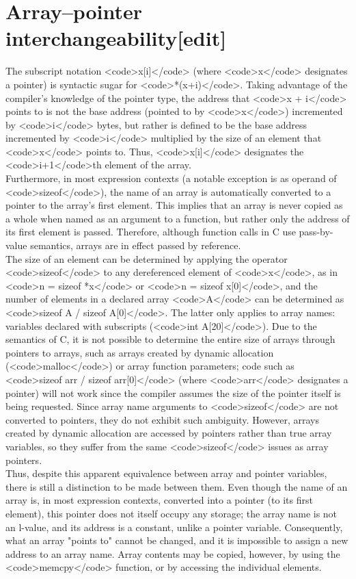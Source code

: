 \documentclass{article}\usepackage{titlesec}
\begin{document}
\section{Array–pointer interchangeability[edit]}
The subscript notation <code>x[i]</code> (where <code>x</code> designates a pointer) is syntactic sugar for <code>*(x+i)</code>. Taking advantage of the compiler's knowledge of the pointer type, the address that <code>x + i</code> points to is not the base address (pointed to by <code>x</code>) incremented by <code>i</code> bytes, but rather is defined to be the base address incremented by <code>i</code> multiplied by the size of an element that <code>x</code> points to.  Thus, <code>x[i]</code> designates the <code>i+1</code>th element of the array.
\\
Furthermore, in most expression contexts (a notable exception is as operand of <code>sizeof</code>), the name of an array is automatically converted to a pointer to the array's first element. This implies that an array is never copied as a whole when named as an argument to a function, but rather only the address of its first element is passed. Therefore, although function calls in C use pass-by-value semantics, arrays are in effect passed by reference.
\\
The size of an element can be determined by applying the operator <code>sizeof</code> to any dereferenced element of <code>x</code>, as in <code>n = sizeof *x</code> or <code>n = sizeof x[0]</code>, and the number of elements in a declared array <code>A</code> can be determined as <code>sizeof A / sizeof A[0]</code>. The latter only applies to array names: variables declared with subscripts (<code>int A[20]</code>). Due to the semantics of C, it is not possible to determine the entire size of arrays through pointers to arrays, such as arrays created by dynamic allocation (<code>malloc</code>) or array function parameters; code such as <code>sizeof arr / sizeof arr[0]</code> (where <code>arr</code> designates a pointer) will not work since the compiler assumes the size of the pointer itself is being requested. Since array name arguments to <code>sizeof</code> are not converted to pointers, they do not exhibit such ambiguity. However, arrays created by dynamic allocation are accessed by pointers rather than true array variables, so they suffer from the same <code>sizeof</code> issues as array pointers.
\\
Thus, despite this apparent equivalence between array and pointer variables, there is still a distinction to be made between them. Even though the name of an array is, in most expression contexts, converted into a pointer (to its first element), this pointer does not itself occupy any storage; the array name is not an l-value, and its address is a constant, unlike a pointer variable. Consequently, what an array "points to" cannot be changed, and it is impossible to assign a new address to an array name. Array contents may be copied, however, by using the <code>memcpy</code> function, or by accessing the individual elements.
\\
\end{document}
